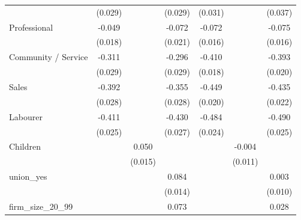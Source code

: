 {\begin{tabular}{l*{6}{c}}
                    &     (0.029)         &                     &     (0.029)         &     (0.031)         &                     &     (0.037)         \\
Professional        &      -0.049\sym{***}&                     &      -0.072\sym{***}&      -0.072\sym{***}&                     &      -0.075\sym{***}\\
                    &     (0.018)         &                     &     (0.021)         &     (0.016)         &                     &     (0.016)         \\
Community / Service &      -0.311\sym{***}&                     &      -0.296\sym{***}&      -0.410\sym{***}&                     &      -0.393\sym{***}\\
                    &     (0.029)         &                     &     (0.029)         &     (0.018)         &                     &     (0.020)         \\
Sales               &      -0.392\sym{***}&                     &      -0.355\sym{***}&      -0.449\sym{***}&                     &      -0.435\sym{***}\\
                    &     (0.028)         &                     &     (0.028)         &     (0.020)         &                     &     (0.022)         \\
Labourer            &      -0.411\sym{***}&                     &      -0.430\sym{***}&      -0.484\sym{***}&                     &      -0.490\sym{***}\\
                    &     (0.025)         &                     &     (0.027)         &     (0.024)         &                     &     (0.025)         \\
Children            &                     &       0.050\sym{***}&                     &                     &      -0.004         &                     \\
                    &                     &     (0.015)         &                     &                     &     (0.011)         &                     \\
union\_yes           &                     &                     &       0.084\sym{***}&                     &                     &       0.003         \\
                    &                     &                     &     (0.014)         &                     &                     &     (0.010)         \\
firm\_size\_20\_99     &                     &                     &       0.073\sym{***}&                     &                     &       0.028\sym{***}\\

\end{tabular}}

